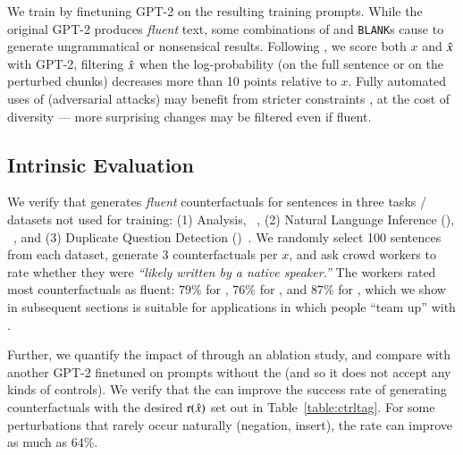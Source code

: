 We train \sysname by finetuning GPT-2 \cite{radford2019language} on the resulting training prompts.
While the original GPT-2 produces \emph{fluent} text,
some combinations of \tagstrs and \texttt{BLANK}s cause \sysname to generate ungrammatical or nonsensical results.
Following \citet{morris2020textattack}, we score both $x$ and $\hat{x}$ with GPT-2, filtering $\hat{x}$ when the log-probability (on the full sentence or on the perturbed chunks) decreases more than 10 points relative to $x$.
Fully automated uses of \sysname (\eg adversarial attacks) may benefit from stricter constraints \cite{morris2020textattack}, at the cost of diversity --- more surprising changes may be filtered even if fluent.


\subsection{Intrinsic Evaluation}
\label{subsec:intrinsic}



We verify that \sysname generates \emph{fluent} counterfactuals for sentences in three tasks / datasets not used for training: (1) \sst Analysis, \dsst~\cite{socher2013recursive},
(2) Natural Language Inference (\nli), \dnli~\cite{bowman-etal-2015-large}, and 
(3) Duplicate Question Detection (\dqqp)~\cite{wang2018glue}.
We randomly select 100 sentences from each dataset, generate 3 \sysname counterfactuals per $x$, and ask crowd workers to rate whether they were \emph{``likely written by a native speaker.''}
The workers rated most counterfactuals as fluent: $79\%$ for \dsst, $76\%$ for \dqqp, and $87\%$ for \dnli,  which we show in subsequent sections is suitable for applications in which people ``team up'' with \sysname.

Further, we quantify the impact of \tagstrs through an ablation study, and compare \sysname with another GPT-2 finetuned on prompts without the \tagstrshorts (and so it does not accept any kinds of controls). 
We verify that the \tagstrshorts can improve the success rate of generating counterfactuals with the desired $\operatorname*{r}(\hat{x})$ set out in Table~\ref{table:ctrltag}.
For some perturbations that rarely occur naturally (\eg negation, insert), the rate can improve as much as 64\%.

